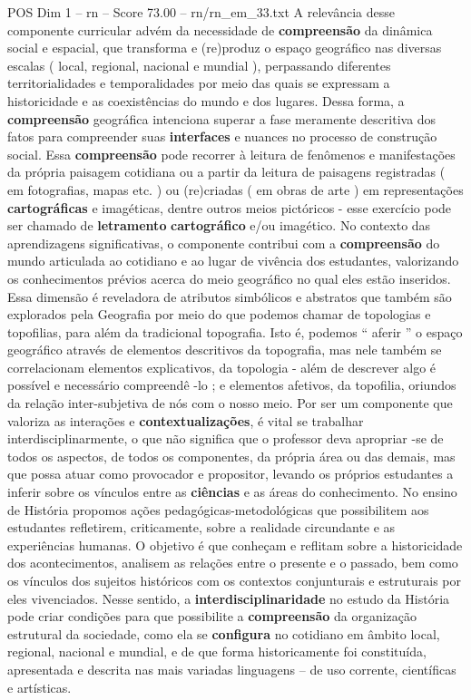 \begin{textsample}{POS Dim 1 – rn – Score 73.00 – rn/rn\_em\_33.txt}
A relevância desse componente curricular advém da necessidade de \textbf{compreensão} da dinâmica social e espacial, que transforma e (re)produz o espaço geográfico nas diversas escalas ( local, regional, nacional e mundial ), perpassando diferentes territorialidades e temporalidades por meio das quais se expressam a historicidade e as coexistências do mundo e dos lugares.
Dessa forma, a \textbf{compreensão} geográfica intenciona superar a fase meramente descritiva dos fatos para compreender suas \textbf{interfaces} e nuances no processo de construção social.
Essa \textbf{compreensão} pode recorrer à leitura de fenômenos e manifestações da própria paisagem cotidiana ou a partir da leitura de paisagens registradas ( em fotografias, mapas etc. ) ou (re)criadas ( em obras de arte ) em representações \textbf{cartográficas} e imagéticas, dentre outros meios pictóricos - esse exercício pode ser chamado de \textbf{letramento} \textbf{cartográfico} e/ou imagético.
No contexto das aprendizagens significativas, o componente contribui com a \textbf{compreensão} do mundo articulada ao cotidiano e ao lugar de vivência dos estudantes, valorizando os conhecimentos prévios acerca do meio geográfico no qual eles estão inseridos.
Essa dimensão é reveladora de atributos simbólicos e abstratos que também são explorados pela Geografia por meio do que podemos chamar de topologias e topofilias, para além da tradicional topografia.
Isto é, podemos “ aferir ” o espaço geográfico através de elementos descritivos da topografia, mas nele também se correlacionam elementos explicativos, da topologia - além de descrever algo é possível e necessário compreendê -lo ; e elementos afetivos, da topofilia, oriundos da relação inter-subjetiva de nós com o nosso meio.
Por ser um componente que valoriza as interações e \textbf{contextualizações}, é vital se trabalhar interdisciplinarmente, o que não significa que o professor deva apropriar -se de todos os aspectos, de todos os componentes, da própria área ou das demais, mas que possa atuar como provocador e propositor, levando os próprios estudantes a inferir sobre os vínculos entre as \textbf{ciências} e as áreas do conhecimento.
No ensino de História propomos ações pedagógicas-metodológicas que possibilitem aos estudantes refletirem, criticamente, sobre a realidade circundante e as experiências humanas.
O objetivo é que conheçam e reflitam sobre a historicidade dos acontecimentos, analisem as relações entre o presente e o passado, bem como os vínculos dos sujeitos históricos com os contextos conjunturais e estruturais por eles vivenciados.
Nesse sentido, a \textbf{interdisciplinaridade} no estudo da História pode criar condições para que possibilite a \textbf{compreensão} da organização estrutural da sociedade, como ela se \textbf{configura} no cotidiano em âmbito local, regional, nacional e mundial, e de que forma historicamente foi constituída, apresentada e descrita nas mais variadas linguagens – de uso corrente, científicas e artísticas.

\end{textsample}

